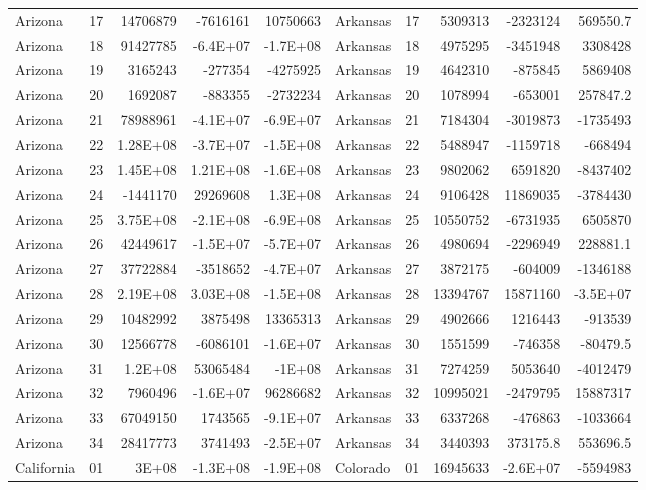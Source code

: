 \begin{landscape}
\begin{singlespace}
\begin{longtable}{lrrrr|lrrrr}
		Arizona &  17 & 14706879 & -7616161 & 10750663 & Arkansas &  17 & 5309313 & -2323124 & 569550.7 \\
		Arizona &  18 & 91427785 & -6.4E+07 & -1.7E+08 & Arkansas &  18 & 4975295 & -3451948 & 3308428 \\
		Arizona &  19 & 3165243 & -277354 & -4275925 & Arkansas &  19 & 4642310 & -875845 & 5869408 \\
		Arizona &  20 & 1692087 & -883355 & -2732234 & Arkansas &  20 & 1078994 & -653001 & 257847.2 \\
		Arizona &  21 & 78988961 & -4.1E+07 & -6.9E+07 & Arkansas &  21 & 7184304 & -3019873 & -1735493 \\
		Arizona &  22 & 1.28E+08 & -3.7E+07 & -1.5E+08 & Arkansas &  22 & 5488947 & -1159718 & -668494 \\
		Arizona &  23 & 1.45E+08 & 1.21E+08 & -1.6E+08 & Arkansas &  23 & 9802062 & 6591820 & -8437402 \\
		Arizona &  24 & -1441170 & 29269608 & 1.3E+08 & Arkansas &  24 & 9106428 & 11869035 & -3784430 \\
		Arizona &  25 & 3.75E+08 & -2.1E+08 & -6.9E+08 & Arkansas &  25 & 10550752 & -6731935 & 6505870 \\
		Arizona &  26 & 42449617 & -1.5E+07 & -5.7E+07 & Arkansas &  26 & 4980694 & -2296949 & 228881.1 \\
		Arizona &  27 & 37722884 & -3518652 & -4.7E+07 & Arkansas &  27 & 3872175 & -604009 & -1346188 \\
		Arizona &  28 & 2.19E+08 & 3.03E+08 & -1.5E+08 & Arkansas &  28 & 13394767 & 15871160 & -3.5E+07 \\
		Arizona &  29 & 10482992 & 3875498 & 13365313 & Arkansas &  29 & 4902666 & 1216443 & -913539 \\
		Arizona &  30 & 12566778 & -6086101 & -1.6E+07 & Arkansas &  30 & 1551599 & -746358 & -80479.5 \\
		Arizona &  31 & 1.2E+08 & 53065484 & -1E+08 & Arkansas &  31 & 7274259 & 5053640 & -4012479 \\
		Arizona &  32 & 7960496 & -1.6E+07 & 96286682 & Arkansas &  32 & 10995021 & -2479795 & 15887317 \\
		Arizona &  33 & 67049150 & 1743565 & -9.1E+07 & Arkansas &  33 & 6337268 & -476863 & -1033664 \\
		Arizona &  34 & 28417773 & 3741493 & -2.5E+07 & Arkansas &  34 & 3440393 & 373175.8 & 553696.5\\
\hline
		California &  01  & 3E+08 & -1.3E+08 & -1.9E+08 & Colorado &  01  & 16945633 & -2.6E+07 & -5594983 \\

\end{longtable}
\end{singlespace}
\end{landscape}
